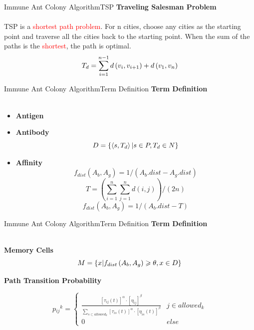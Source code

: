 \begin{frame}{Immune Ant Colony Algorithm}{TSP}
 \large \textbf{Traveling Salesman Problem}\\~\\
 {TSP is a \textcolor{red}{shortest path problem}. For n cities, choose any cities as the starting point and traverse all the cities back to the starting point. When the sum of the paths is the \textcolor{red}{shortest}, the path is optimal.}
 \begin{equation} \small{
 T_{d}=\sum_{i=1}^{n-1}d\left (v_{i},v_{i+1}\right )+d\left (v_{1},v_{n} \right)}
 \end{equation}
\end{frame}

\begin{frame}{Immune Ant Colony Algorithm}{Term Definition}
\large \textbf{Term Definition}\\~\\
\begin{itemize}
\item \textbf{Antigen}
\item \textbf{Antibody}
\begin{equation}\small{
  D=\left \{\left \langle s,T_d\right \rangle | s \in P , T_d \in N \right \}}
\end{equation}
\item \textbf{Affinity}
\small{
\begin{equation}
  f_{dist}\left(A_{b},A_{g} \right) = 1 /\left(A_{b}.dist - A_{g}.dist\right)
\end{equation}
\begin{equation}
  T = \left(\sum_{i=1}^{n} \sum_{j=1}^{n}d\left(i,j\right)\right)/\left(2n\right)
\end{equation}
\begin{equation}
  f_{dist}\left(A_{b},A_{g} \right) = 1 /\left(A_{b}.dist - T\right)
\end{equation}}
\end{itemize}
\end{frame}

\begin{frame}{Immune Ant Colony Algorithm}{Term Definition}
\large \textbf{Term Definition}\\~\\
\begin{itemize}
\item \textbf{Memory Cells}
\begin{equation} \small{
  M=\left \{ x |f_{dist} \left(A_{b},A_{g}\right)\geqslant \theta,x \in D \right \}}
\end{equation} \small{
\item \textbf{Path Transition Probability}}
\begin{equation}
p{_{ij}}^{k} =
\begin{cases}
\frac{[\tau_{ij}(t)]^\alpha \cdot [\eta_{ij}]^\beta} { \sum\limits_{s \subset allowed_{k}} [\tau_{is}(t)]^\alpha \cdot [\eta_{is}(t)]^\beta} & j \in allowed_k \\
0 & else
\end{cases}
\end{equation}
\end{itemize}
\end{frame}

